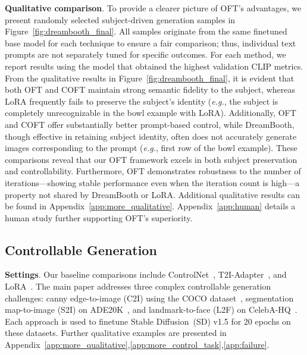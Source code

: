 \textbf{Qualitative comparison}. To provide a clearer picture of OFT's advantages, we present randomly selected subject-driven generation samples in Figure~\ref{fig:dreambooth_final}. All samples originate from the same finetuned base model for each technique to ensure a fair comparison; thus, individual text prompts are not separately tuned for specific outcomes. For each method, we report results using the model that obtained the highest validation CLIP metrics. From the qualitative results in Figure~\ref{fig:dreambooth_final}, it is evident that both OFT and COFT maintain strong semantic fidelity to the subject, whereas LoRA frequently fails to preserve the subject’s identity (\emph{e.g.}, the subject is completely unrecognizable in the bowl example with LoRA). Additionally, OFT and COFT offer substantially better prompt-based control, while DreamBooth, though effective in retaining subject identity, often does not accurately generate images corresponding to the prompt (\emph{e.g.}, first row of the bowl example). These comparisons reveal that our OFT framework excels in both subject preservation and controllability. Furthermore, OFT demonstrates robustness to the number of iterations—showing stable performance even when the iteration count is high—a property not shared by DreamBooth or LoRA. Additional qualitative results can be found in Appendix~\ref{app:more_qualitative}. Appendix~\ref{app:human} details a human study further supporting OFT’s superiority.

\subsection{Controllable Generation}

\textbf{Settings}. Our baseline comparisons include ControlNet~\cite{zhang2023adding}, T2I-Adapter~\cite{mou2023t2i}, and LoRA~\cite{hulora2022}. The main paper addresses three complex controllable generation challenges: canny edge-to-image (C2I) using the COCO dataset~\cite{lin2014microsoft}, segmentation map-to-image (S2I) on ADE20K~\cite{zhou2017scene}, and landmark-to-face (L2F) on CelebA-HQ~\cite{karras2018progressive,xia2021tedigan}. Each approach is used to finetune Stable Diffusion~(SD) v1.5 for 20 epochs on these datasets. Further qualitative examples are presented in Appendix~\ref{app:more_qualitative},\ref{app:more_control_task},\ref{app:failure}.

